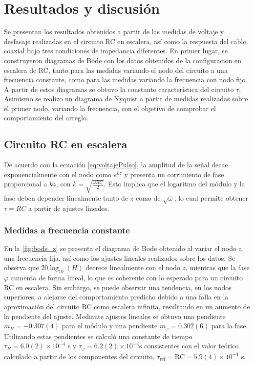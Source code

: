 \section{Resultados y discusión}

Se presentan los resultados obtenidos a partir de las medidas de voltaje y desfasaje realizadas en el circuito RC en escalera, así como la respuesta del cable coaxial bajo tres condiciones de impedancia diferentes. En primer lugar, se construyeron diagramas de Bode con los datos obtenidos de la configuracion en escalera de RC, tanto para las medidas variando el nodo del circuito a una frecuencia constante, como para las medidas variando la frecuencia con nodo fijo. A partir de estos diagramas se obtuvo la constante característica del circuito \(\tau\). Asimismo se realizo un diagrama de Nyquist a partir de medidas realizadas sobre el primer nodo, variando la frecuencia, con el objetivo de comprobar el comportamiento del arreglo. 


\subsection{Circuito RC en escalera}

De acuerdo con la ecuación \eqref{eq:voltajePulso}, la amplitud de la señal decae exponencialmente con el nodo como $e^{kz}$ y presenta un corrimiento de fase proporcional a $kz$, con $k = \sqrt{\frac{\omega RC}{2}}$. Esto implica que el logaritmo del módulo y la fase deben depender linealmente tanto de $z$ como de $\sqrt{\omega}$, lo cual permite obtener $\tau=RC$ a partir de ajustes lineales. 

\subsubsection{Medidas a frecuencia constante}

 En la \autoref{fig:bode_z} se presenta el diagrama de Bode obtenido al variar el nodo a una frecuencia fija, así como los ajustes lineales realizados sobre los datos. Se observa que $20\log_{10}(H)$ decrece linealmente
     con el nodo $z$, mientras que la fase $\varphi$ aumenta de forma lineal, lo que es coherente con lo esperado para un circuito RC en escalera. Sin embargo, se puede observar una tendencia, en los nodos superiores, a alejarse del comportamiento predicho debido a una falla en la aproximación del circuito RC como escalera infinita, resultando en un aumento de la pendiente del ajuste.
     Mediante ajustes lineales se obtuvo una pendiente $m_H= -0.307(4)$ para el módulo y una pendiente $m_\varphi = 0.302(6)$ para la fase. Utilizando estas pendientes se calculó una constante de tiempo $\tau_H = 6.0(2)\times 10^{-4}$ \si{\second} y
      $\tau_{\varphi}=6.2(2)\times 10^{-4}$\si{\second} consistentes con el valor teórico calculado a partir de los componentes del circuito,
       $\tau_{\text{ref}} = \text{RC} = 5.9(4) \times 10^{-4}$ \si{\second}.  

